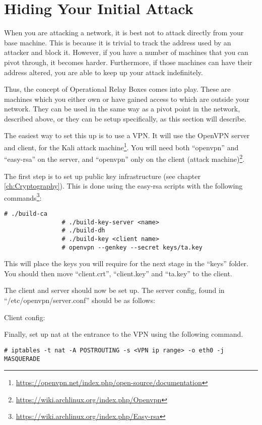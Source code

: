 	\section{Hiding Your Initial Attack}
		When you are attacking a network, it is best not to attack directly from your base machine.
		This is because it is trivial to track the address used by an attacker and block it.
		However, if you have a number of machines that you can pivot through, it becomes harder.
		Furthermore, if those machines can have their address altered, you are able to keep up your attack indefinitely.

		Thus, the concept of Operational Relay Boxes comes into play.
		These are machines which you either own or have gained access to which are outside your network.
		They can be used in the same way as a pivot point in the network, described above, or they can be setup specifically, as this section will describe.

		 
		The easiest way to set this up is to use a VPN.
		It will use the OpenVPN server and client, for the Kali attack machine\footnote{\url{https://openvpn.net/index.php/open-source/documentation}}.
		You will need both ``openvpn'' and ``easy-rsa'' on the server, and ``openvpn'' only on the client (attack machine)\footnote{\url{https://wiki.archlinux.org/index.php/Openvpn}}.

		The first step is to set up public key infrastructure (see chapter \ref{ch:Cryptography}).
		This is done using the easy-rsa scripts with the following commands\footnote{\url{https://wiki.archlinux.org/index.php/Easy-rsa}}:
			\begin{lstlisting}[style=CLI]
				# ./build-ca
				# ./build-key-server <name>
				# ./build-dh
				# ./build-key <client name>
				# openvpn --genkey --secret keys/ta.key
			\end{lstlisting}
		This will place the keys you will require for the next stage in the ``keys'' folder.
		You should then move ``client.crt'', ``client.key'' and ``ta.key'' to the client.

		The client and server should now be set up.
		The server config, found in ``/etc/openvpn/server.conf'' should be as follows:
		
		Client config:
		
		Finally, set up nat at the entrance to the VPN using the following command.
			\begin{lstlisting}[style=CLI]
				# iptables -t nat -A POSTROUTING -s <VPN ip range> -o eth0 -j MASQUERADE
			\end{lstlisting}

